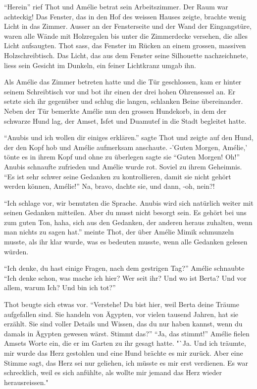 \documentclass[11pt,titlepage,a5paper]{book}
\begin{document}
 "`Herein"' rief Thot und Amélie betrat sein Arbeitszimmer. Der Raum war achteckig! Das Fenster, das in den Hof des weissen Hauses zeigte, brachte wenig Licht in das Zimmer. Ausser an der Fensterseite und der Wand der Eingangstüre, waren alle Wände mit Holzregalen bis unter die Zimmerdecke versehen, die alles Licht aufsaugten. Thot sass, das Fenster im Rücken an einem grossen, massiven Holzschreibtisch. Das Licht, das aus dem Fenster seine Silhouette nachzeichnete, liess sein Gesicht im Dunkeln, ein feiner Lichtkranz umgab ihn.
 
 Als Amélie das Zimmer betreten hatte und die Tür geschlossen, kam er hinter seinem Schreibtisch vor und bot ihr einen der drei hohen Ohrensessel an. Er setzte sich ihr gegenüber und schlug die langen, schlanken Beine übereinander. Neben der Tür bemerkte Amélie nun den grossen Hundekorb, in dem der schwarze Hund lag, der Amset, Isfet und Duamutef in die Stadt begleitet hatte.
 
 "`Anubis und ich wollen dir einiges erklären."' sagte Thot und zeigte auf den Hund, der den Kopf hob und Amélie aufmerksam anschaute. -'Guten Morgen, Amélie,' tönte es in ihrem Kopf und ohne zu überlegen sagte sie "`Guten Morgen! Oh!"' Anubis schnaufte zufrieden und Amélie wurde rot. Soviel zu ihrem Geheimnis. "`Es ist sehr schwer seine Gedanken zu kontrollieren, damit sie nicht gehört werden können, Amélie!"' Na, bravo, dachte sie, und dann, -oh, nein?!
 
 "`Ich schlage vor, wir benutzten die Sprache. Anubis wird sich natürlich weiter mit seinen Gedanken mitteilen. Aber du musst nicht besorgt sein. Es gehört bei uns zum guten Ton, haha, sich aus den Gedanken, der anderen heraus zuhalten, wenn man nichts zu sagen hat."' meinte Thot, der über Amélie Mimik schmunzeln musste, als ihr klar wurde, was es bedeuten musste, wenn alle Gedanken gelesen würden. 
 
"`Ich denke, du hast einige Fragen, nach dem gestrigen Tag?"' Amélie schnaubte "`Ich denke schon, was mache ich hier? Wer seit ihr? Und wo ist Berta? Und vor allem, warum Ich? Und bin ich tot?"' 

Thot beugte sich etwas vor. "`Verstehe! Du bist hier, weil Berta deine Träume aufgefallen sind. Sie handeln von Ägypten, vor vielen tausend Jahren, hat sie erzählt. Sie sind voller Details und Wissen, das du nur haben kannst, wenn du damals in Ägypten gewesen wärst. Stimmt das?"' "`Ja, das stimmt!"' Amélie fielen Amsets Worte ein, die er im Garten zu ihr gesagt hatte. "`Ja. Und ich träumte, mir wurde das Herz gestohlen und eine Hund brächte es mir zurück. Aber eine Stimme sagt, das Herz sei nur geliehen, ich müsste es mir erst verdienen. Es war schrecklich, weil es sich anfühlte, als wollte mir jemand das Herz wieder herausreissen."
\end{document}
